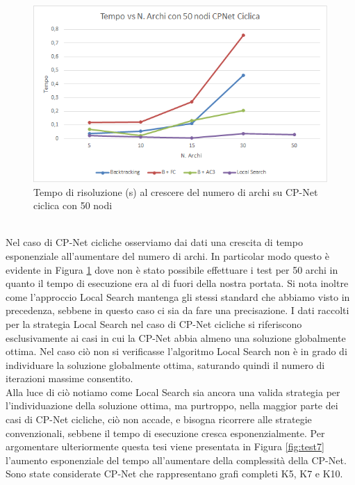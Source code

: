 \documentclass[a4paper,titlepage]{article}
\begin{document}
\begin{figure}[!h]
\centering
\includegraphics[scale=0.75]{../img/50NodiCicliche.png}
\caption{Tempo di risoluzione (s) al crescere del numero di archi su CP-Net ciclica con 50 nodi}\label{fig:test6}
\end{figure}
\\Nel caso di CP-Net cicliche osserviamo dai dati una crescita di tempo esponenziale all'aumentare del numero di archi. In particolar modo questo è evidente in Figura \ref{fig:test6} dove non è stato possibile effettuare i test per 50 archi in quanto il tempo di esecuzione era al di fuori della nostra portata. Si nota inoltre come l'approccio Local Search mantenga gli stessi standard che abbiamo visto in precedenza, sebbene in questo caso ci sia da fare una precisazione. I dati raccolti per la strategia Local Search nel caso di CP-Net cicliche si riferiscono esclusivamente ai casi in cui la CP-Net abbia almeno una soluzione globalmente ottima. Nel caso ciò non si verificasse l'algoritmo Local Search non è in grado di individuare la soluzione globalmente ottima, saturando quindi il numero di iterazioni massime consentito.\\
Alla luce di ciò notiamo come Local Search sia ancora una valida strategia per l'individuazione della soluzione ottima, ma purtroppo, nella maggior parte dei casi di CP-Net cicliche, ciò non accade, e bisogna ricorrere alle strategie convenzionali, sebbene il tempo di esecuzione cresca esponenzialmente. Per argomentare ulteriormente questa tesi viene presentata in Figura \ref{fig:test7} l'aumento esponenziale del tempo all'aumentare della complessità della CP-Net. Sono state considerate CP-Net che rappresentano grafi completi K5, K7 e K10.
\end{document}
